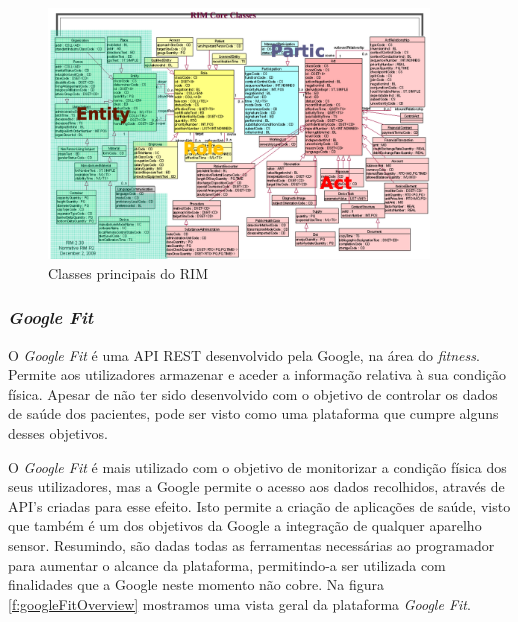 \begin{figure}[H]
  \centering
  \includegraphics[width=0.9\textwidth]{imgs/hl7-rim.png}
  \caption[Classes principais do \gls{RIM}]{Classes principais do \gls{RIM} \cite{hl7-rim}}
  
  \label{f:rimclass}
\end{figure}




\subsubsection{\textit{Google Fit}}
O \textit{Google Fit} é uma \gls{API} \gls{REST} desenvolvido pela Google, na área do \textit{fitness}. Permite aos utilizadores armazenar e aceder a informação relativa à sua condição física. Apesar de não ter sido desenvolvido com o objetivo de controlar os dados de saúde dos pacientes, pode ser visto como uma plataforma que cumpre alguns desses objetivos.
\par 
O \textit{Google Fit} é mais utilizado com o objetivo de monitorizar a condição física dos seus utilizadores, mas a Google permite o acesso aos dados recolhidos, através de \gls{API}’s criadas para esse efeito. Isto permite a criação de aplicações de saúde, visto que também é um dos objetivos da Google a integração de qualquer aparelho sensor. Resumindo, são dadas todas as ferramentas necessárias ao programador para aumentar o alcance da plataforma, permitindo-a ser utilizada com finalidades que a Google neste momento não cobre. 
Na figura \ref{f:googleFitOverview} mostramos uma vista geral da plataforma \textit{Google Fit}.

